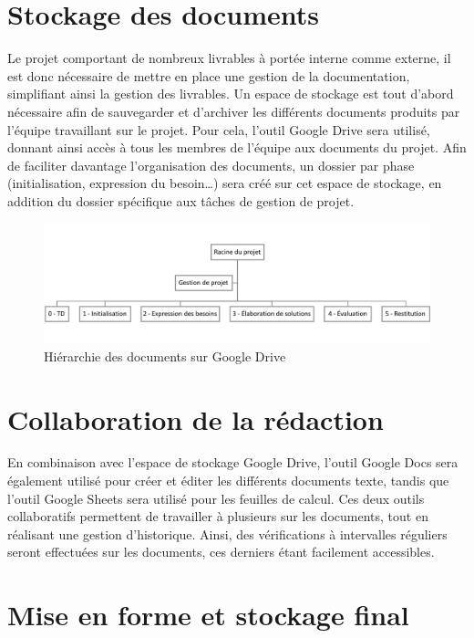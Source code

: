 \section{Stockage des documents}

Le projet comportant de nombreux livrables à portée interne comme externe, il est donc nécessaire de mettre en place une gestion de la documentation, simplifiant ainsi la gestion des livrables. Un espace de stockage est tout d’abord nécessaire afin de sauvegarder et d’archiver les différents documents produits par l’équipe travaillant sur le projet. Pour cela, l’outil Google Drive sera utilisé, donnant ainsi accès à tous les membres de l’équipe aux documents du projet. Afin de faciliter davantage l’organisation des documents, un dossier par phase (initialisation, expression du besoin…) sera créé sur cet espace de stockage, en addition du dossier spécifique aux tâches de gestion de projet.
 
\begin{figure}[H]
    \centering
    \label{fig-arbo}
    \includegraphics[scale=0.65]{figures/arbo.png}
    \caption{Hiérarchie des documents sur Google Drive }
\end{figure}

\section{Collaboration de la rédaction}

En combinaison avec l’espace de stockage Google Drive, l’outil Google Docs sera également utilisé pour créer et éditer les différents documents texte, tandis que l’outil Google Sheets sera utilisé pour les feuilles de calcul. Ces deux outils collaboratifs permettent de travailler à plusieurs sur les documents, tout en réalisant une gestion d’historique. Ainsi, des vérifications à intervalles réguliers seront effectuées sur les documents, ces derniers étant facilement accessibles.
 
\section{Mise en forme et stockage final}

